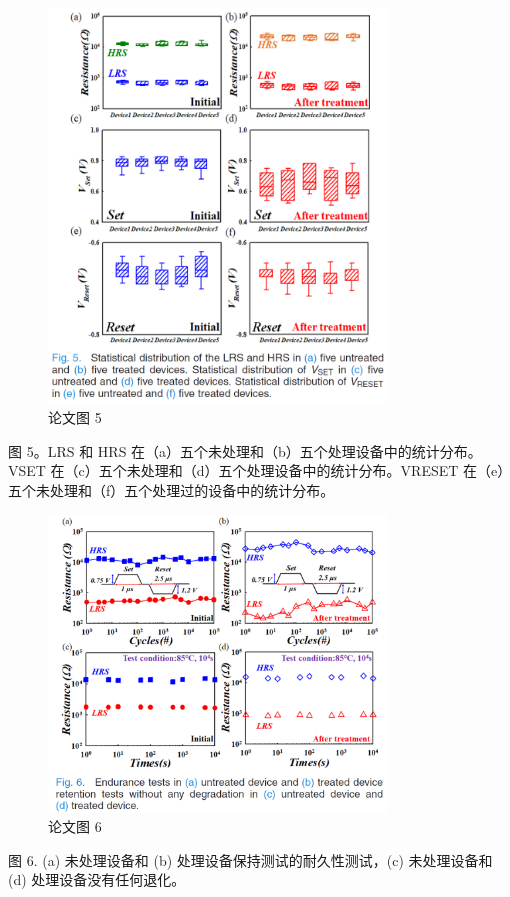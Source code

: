 \begin{figure}[htb]
\centering 
\includegraphics[width=0.80\textwidth]{img/c1m5.png} 
\caption{论文图 5}
\label{Test}
\end{figure}
图 5。LRS 和 HRS 在（a）五个未处理和（b）五个处理设备中的统计分布。VSET 在（c）五个未处理和（d）五个处理设备中的统计分布。VRESET 在（e）五个未处理和（f）五个处理过的设备中的统计分布。

\begin{figure}[htb]
\centering 
\includegraphics[width=0.80\textwidth]{img/c1m6.png} 
\caption{论文图 6}
\label{Test}
\end{figure}
图 6. (a) 未处理设备和 (b) 处理设备保持测试的耐久性测试，(c) 未处理设备和 (d) 处理设备没有任何退化。

